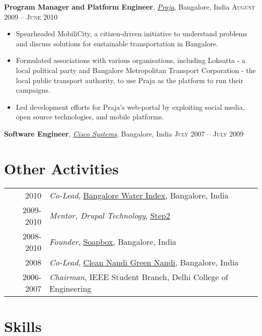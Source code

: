 \documentclass[11pt]{article}
\begin{document}
\textbf{Program Manager and Platform Engineer}, \emph{\href{http://praja.in}{Praja}}, Bangalore, India
 \hfill \textsc{\normalsize August 2009 -- June 2010}\\
\begin{itemize}
\item Spearheaded MobiliCity, a citizen-driven initiative to understand problems and discuss solutions for sustainable transportation in Bangalore.
\item Formulated associations with various organisations, including Loksatta - a local political party and Bangalore Metropolitan Transport Corporation - the local public transport authority, to use Praja as the platform  to run their campaigns.
\item Led development efforts for Praja’s web-portal by exploiting social media, open source technologies, and mobile platforms.\\
\end{itemize}
\vspace{0.6em}

\textbf{Software Engineer}, \emph{\href{http://www.cisco.com}{Cisco Systems}}, Bangalore, India \hfill \textsc{\normalsize July 2007 -- July 2009}\\
\section{Other Activities}
\label{sec-5}


\begin{center}
\begin{tabular}{rp{16cm}}
      2010  &  \emph{Co-Lead}, \href{http://praja.in/en/bwi}{Bangalore Water Index}, Bangalore, India                   \\
 2009-2010  &  \emph{Mentor, Drupal Technology}, \href{http://steptwo.co.in/}{Step2}                                    \\
 2008-2010  &  \emph{Founder}, \href{http://soapboxblr.wordpress.com/}{Soapbox}, Bangalore, India                       \\
      2008  &  \emph{Co-Lead}, \href{http://cleannandihills.wordpress.com/}{Clean Nandi Green Nandi}, Bangalore, India  \\
 2006-2007  &  \emph{Chairman}, IEEE Student Branch, Delhi College of Engineering                                       \\
\end{tabular}
\end{center}
\section{Skills}
\label{sec-6}
\end{document}
